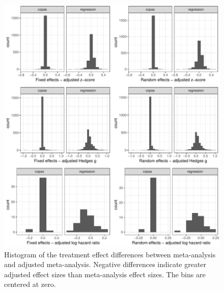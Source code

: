 \begin{figure}
\begin{knitrout}
\color{fgcolor}

{\centering \includegraphics[width=\textwidth-3cm]{figure/ch03_figunnamed-chunk-7-1} 

}



\end{knitrout}
\caption{Histogram of the treatment effect differences between meta-analysis and adjusted meta-analysis. Negative differences indicate greater adjusted effect sizes than meta-analysis effect sizes. The bins are centered at zero.}
\label{fig:adjustment.size}
\end{figure}

